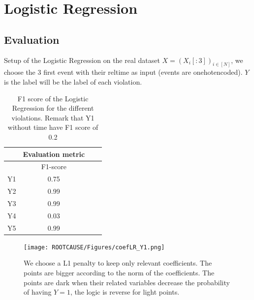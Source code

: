 \documentclass{beamer}
\begin{document}
\section{Logistic Regression}
\subsection{Evaluation}
\begin{frame} %
\begin{block}{Setup of the Logistic Regression on the real dataset}
		$X= (X_i[:3])_{i\in [N]}$, we choose the 3 first event with their reltime as input (events are onehotencoded). $Y$ is the label will be the label of each violation.
\end{block}
\begin{table}[!h]
\begin{tabular}{cccc}
\hline
                & \multicolumn{1}{c}{Evaluation metric} \\ \hline
                 & F1-score   \\ \hline
Y1  & 0.75            \\ \hline
\rowcolor[HTML]{C0C0C0}Y2&      0.99           \\ \hline
Y3&          0.99       \\ \hline
\rowcolor[HTML]{C0C0C0}Y4&        0.03         \\ \hline
Y5&        0.99         \\ \hline
\end{tabular}
\caption{F1 score of the Logistic Regression for the different violations. Remark that Y1 without time have F1 score of 0.2}
\end{table}
\end{frame}




\begin{frame} %

\begin{figure}[!h]
            \texttt{[image: ROOTCAUSE/Figures/coefLR\_Y1.png]}
            \centering
            \caption{\scriptsize We choose a L1 penalty to keep only relevant coefficients. The points are bigger according to the norm of the coefficients. The points are dark when their related variables decrease the probability of having $Y=1$, the logic is reverse for light points. }
            \label{fig1dd}
\end{figure}

\end{frame}
\end{document}
